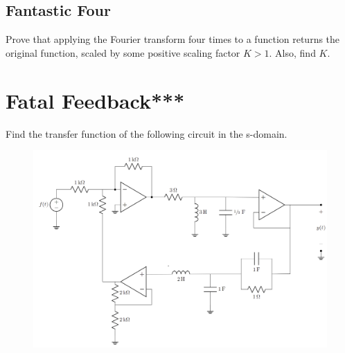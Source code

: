 \documentclass{article}
\begin{document}
\vfill


\subsection{Fantastic Four}
Prove that applying the Fourier transform four times to a function returns the original function, scaled by some positive scaling factor $K > 1$. Also, find $K$.

\vfill

\newpage


\section{Fatal Feedback***}

Find the transfer function of the following circuit in the s-domain.

\begin{figure}[ht!]
\centering
\includegraphics[width=0.8\linewidth]{figures/mega.png}
\end{figure}

\newpage
\end{document}
